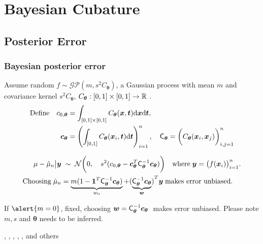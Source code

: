 \documentclass[handout, 10pt,compress,xcolor={usenames,dvipsnames}]{beamer} %
\newcommand{\bm}[1]{\boldsymbol{#1}}
\newcommand{\mCtheta}{\mC_{\vtheta}}
\newcommand{\mCthetaInv}{{\mathsf{C}^{-1}_{\vtheta}}}
\newcommand{\dvx}{\dif {\vx}}
\newcommand{\dvt}{\dif {\vt}}
\renewcommand{\vtheta}{{\bm{\theta}}}
\newcommand{\pause}{}
\begin{document}
\section{Bayesian Cubature}


\subsection{Posterior Error}


\begin{frame}
\frametitle{Bayesian posterior error}
\vspace*{-4ex}
\alert{Assume random}
$f \sim \mathcal{GP} (m, s^2C_{\vtheta})$,
a \alert{Gaussian process} with mean $m$ and covariance kernel $s^2C_{\vtheta}$, $C_{\vtheta}:[0,1] \times [0,1] \to \reals$ .
\vspace*{-1ex}
\begin{align*}
\text{Define} \quad c_{0,\vtheta} &= \int_{[0,1] \times [0,1]} C_{\vtheta} (\vx,\vt) \dvx \dvt, 
\\
\vc_{\vtheta}& = \left( \int_{[0,1] } C_{\vtheta} (\vx_i,\vt) \dvt \right)_{i=1}^n,
\quad
\mCtheta =  \biggl( C_{\vtheta} (\vx_i,\vx_j) \biggr)_{i,j=1}^n
\end{align*}
\pause
\vspace*{-3ex}
\begin{align*}
\mu - \hmu_n  \big \vert \vy & \; \sim \;
\cn
\biggl( %
0, \quad s^2(c_{0,\vtheta} - \vc_{\vtheta} ^T \mCthetaInv \vc_{\vtheta})
\biggr)
\quad %
\text{where} \; \vy = \bigl(f(\vx_i)\bigr)_{i=1}^n. 
\\
\text{Choosing} \; \hmu_n &= \underbrace{m(1 - \vone^T \mCthetaInv \vc_{\vtheta})}_{w_0} + {(\underbrace{\mCthetaInv \vc_{\vtheta}}_{\vw})}^T \vy \; \text{makes error unbiased.} 
\end{align*}
\pause
If $\alert{m = 0}$, fixed, choosing $\vw = \mCthetaInv\vc_{\vtheta} \;$ makes error unbiased. Please note \alert{$m, s$ and $\vtheta$} needs to be inferred.

, , , , ,  and others
\end{frame}
\end{document}

